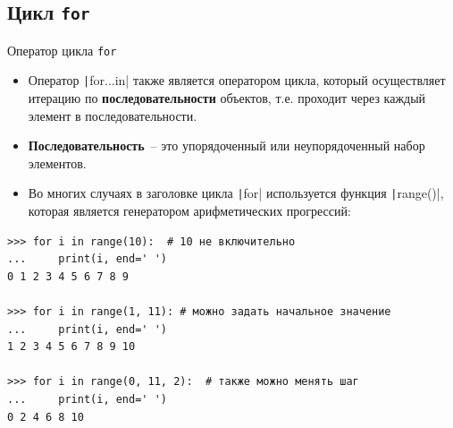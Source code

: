\documentclass[aspectratio=169]{beamer}	%
\begin{document}
\subsection{Цикл \texttt{for}}
\scriptsize
\begin{frame}[fragile]{Оператор цикла \texttt{for}}
	\begin{itemize}
		\item Оператор \texttt|for...in| также является оператором цикла, который осуществляет итерацию по \textcolor{extraorange}{\textbf{последовательности}} объектов, т.е. проходит через каждый элемент в последовательности.
		
		\item \textcolor{extraorange}{\textbf{Последовательность}}~-- это упорядоченный или неупорядоченный набор элементов.
		
		\item Во многих случаях в заголовке цикла \texttt|for| используется функция \texttt|range()|, которая является генератором арифметических прогрессий:
	\end{itemize}

\begin{verbatim}
>>> for i in range(10):  # 10 не включительно
...     print(i, end=' ')
0 1 2 3 4 5 6 7 8 9

>>> for i in range(1, 11): # можно задать начальное значение
...     print(i, end=' ')
1 2 3 4 5 6 7 8 9 10

>>> for i in range(0, 11, 2):  # также можно менять шаг
...     print(i, end=' ')
0 2 4 6 8 10
\end{verbatim}
\vfill
\end{frame}


%
%


%
\end{document}
